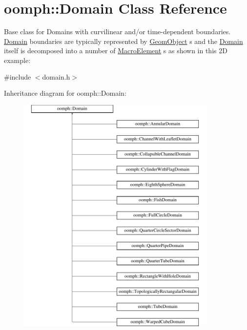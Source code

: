 \hypertarget{classoomph_1_1Domain}{}\section{oomph\+:\+:Domain Class Reference}
\label{classoomph_1_1Domain}


Base class for Domains with curvilinear and/or time-\/dependent boundaries. \hyperlink{classoomph_1_1Domain}{Domain} boundaries are typically represented by \hyperlink{classoomph_1_1GeomObject}{Geom\+Object} s and the \hyperlink{classoomph_1_1Domain}{Domain} itself is decomposed into a number of \hyperlink{classoomph_1_1MacroElement}{Macro\+Element} s as shown in this 2D example\+:  




{\ttfamily \#include $<$domain.\+h$>$}

Inheritance diagram for oomph\+:\+:Domain\+:\begin{figure}[H]
\begin{center}
\leavevmode
\includegraphics[height=12.000000cm]{classoomph_1_1Domain}
\end{center}
\end{figure}
